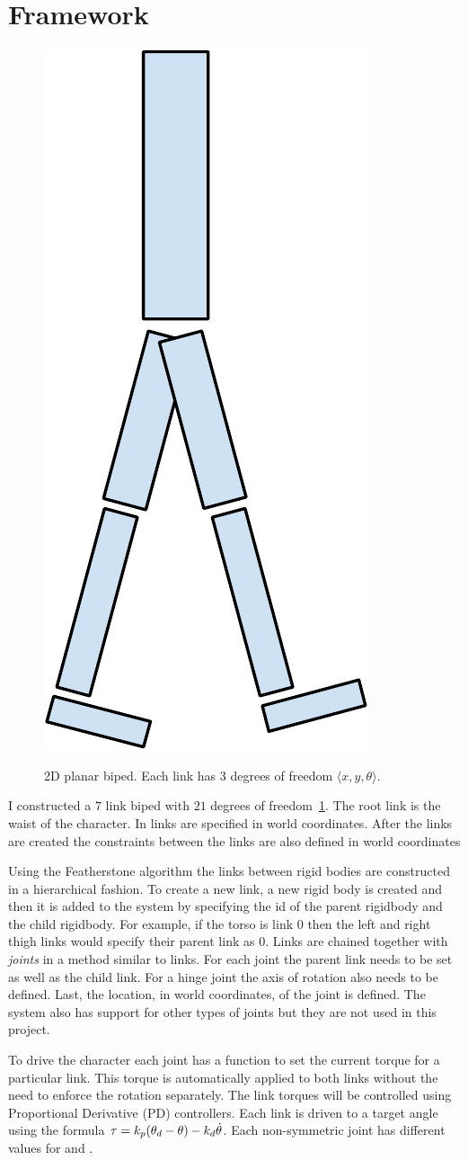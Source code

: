 
\section{Framework}
\label{sec:framework}

\begin{figure}[H]
	\includegraphics[width=0.2\linewidth]{../images/2D-Biped-crop.pdf} \\
	\caption{\label{figure:2d-biped} 2D planar biped. Each link has $3$ degrees of freedom $\langle x, y, \theta \rangle$.}
\end{figure}

I constructed a $7$ link biped with $21$ degrees of freedom~\ref{figure:2d-biped}. 
The root link is the waist of the character.
In \bulletPhysics links are specified in world coordinates.
After the links are created the constraints between the links are also defined in world coordinates
 
Using the Featherstone algorithm the links between rigid bodies are constructed in a hierarchical fashion. 
To create a new link, a new rigid body is created and then it is added to the system by specifying the id of the parent rigidbody and the child rigidbody. 
For example, if the torso is link $0$ then the left and right thigh links would specify their parent link as $0$.
Links are chained together with \emph{joints} in a method similar to links.
For each joint the parent link needs to be set as well as the child link.
For a hinge joint the axis of rotation also needs to be defined.
Last, the location, in world coordinates, of the joint is defined.
The system also has support for other types of joints but they are not used in this project.

To drive the character each joint has a function to set the current torque for a particular link. 
This torque is automatically applied to both links without the need to enforce the rotation separately.
The link torques will be controlled using Proportional Derivative (PD) controllers.
Each link is driven to a target angle using the formula $\tau = k_{p}(\theta_{d}- \theta) - k_{d}\dot{\theta} $.
Each non-symmetric joint has different values for \Kp and \Kd.


